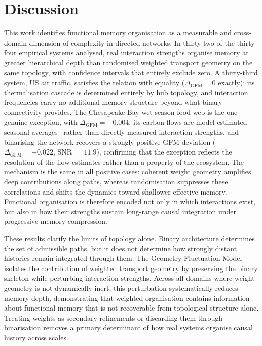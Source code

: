 \documentclass[aps,superscriptaddress,11pt]{revtex4-2}
\theoremstyle{definition}
\theoremstyle{plain}
\begin{document}
\section{Discussion}
This work identifies functional memory organisation as a measurable and
cross-domain dimension of complexity in directed networks. In thirty-two of
the thirty-four empirical systems analysed, real interaction strengths
organise memory at greater hierarchical depth than randomised weighted
transport geometry on the same topology, with confidence intervals that
entirely exclude zero. A thirty-third system, US air traffic, satisfies
the relation with equality ($\Delta_{\mathrm{GFM}} = 0$ exactly): its
thermalisation cascade is determined entirely by hub topology, and
interaction frequencies carry no additional memory structure beyond what
binary connectivity provides. The Chesapeake Bay wet-season food web is
the one genuine exception, with $\Delta_{\mathrm{GFM}} = -0.004$; its
carbon flows are model-estimated seasonal averages~\cite{Baird1989} rather
than directly measured interaction strengths, and binarising the network
recovers a strongly positive GFM deviation ($\Delta_{\mathrm{GFM}} = +0.022$,
SNR $= 11.9$), confirming that the exception reflects the resolution of
the flow estimates rather than a property of the ecosystem. The mechanism
is the same in all positive cases: coherent weight geometry amplifies deep
contributions along paths, whereas randomisation suppresses these
correlations and shifts the dynamics toward shallower effective memory.
Functional organisation is therefore encoded not only in which interactions
exist, but also in how their strengths sustain long-range causal integration
under progressive memory compression.

These results clarify the limits of topology alone. Binary architecture
determines the set of admissible paths, but it does not determine how
strongly distant histories remain integrated through them. The Geometry
Fluctuation Model isolates the contribution of weighted transport geometry
by preserving the binary skeleton while perturbing interaction strengths.
Across all domains where weight geometry is not dynamically inert, this
perturbation systematically reduces memory depth, demonstrating that
weighted organisation contains information about functional memory that is
not recoverable from topological structure alone. Treating weights as
secondary refinements or discarding them through binarisation removes a
primary determinant of how real systems organise causal history across
scales.
\end{document}
